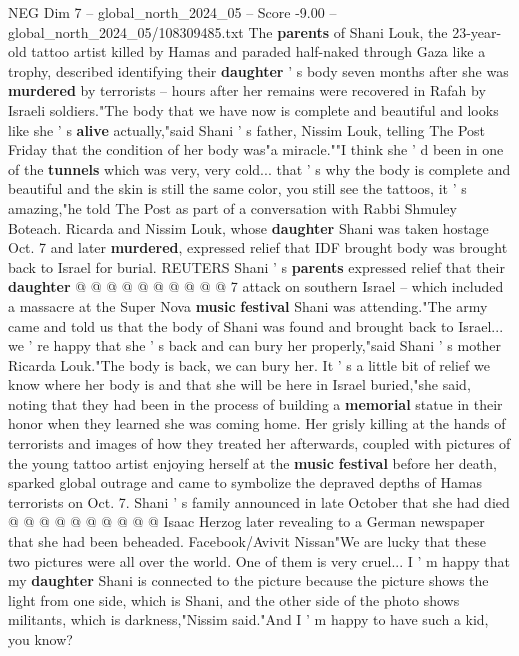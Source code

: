 \begin{textsample}{NEG Dim 7 – global\_north\_2024\_05 – Score -9.00 – global\_north\_2024\_05/108309485.txt}  \label{ex:f7_neg_181}
The \textbf{parents} of Shani Louk, the 23-year-old tattoo artist killed by Hamas and paraded half-naked through Gaza like a trophy, described identifying their \textbf{daughter} ' s body seven months after she was \textbf{murdered} by terrorists -- hours after her remains were recovered in Rafah by Israeli soldiers."The body that we have now is complete and beautiful and looks like she ' s \textbf{alive} actually,"said Shani ' s father, Nissim Louk, telling The Post Friday that the condition of her body was"a miracle.""I think she ' d been in one of the \textbf{tunnels} which was very, very cold... that ' s why the body is complete and beautiful and the skin is still the same color, you still see the tattoos, it ' s amazing,"he told The Post as part of a conversation with Rabbi Shmuley Boteach.
Ricarda and Nissim Louk, whose \textbf{daughter} Shani was taken hostage Oct. 7 and later \textbf{murdered}, expressed relief that IDF brought body was brought back to Israel for burial.
REUTERS Shani ' s \textbf{parents} expressed relief that their \textbf{daughter} @ @ @ @ @ @ @ @ @ @ 7 attack on southern Israel -- which included a massacre at the Super Nova \textbf{music} \textbf{festival} Shani was attending."The army came and told us that the body of Shani was found and brought back to Israel... we ' re happy that she ' s back and can bury her properly,"said Shani ' s mother Ricarda Louk."The body is back, we can bury her.
It ' s a little bit of relief we know where her body is and that she will be here in Israel buried,"she said, noting that they had been in the process of building a \textbf{memorial} statue in their honor when they learned she was coming home.
Her grisly killing at the hands of terrorists and images of how they treated her afterwards, coupled with pictures of the young tattoo artist enjoying herself at the \textbf{music} \textbf{festival} before her death, sparked global outrage and came to symbolize the depraved depths of Hamas terrorists on Oct. 7.
Shani ' s family announced in late October that she had died @ @ @ @ @ @ @ @ @ @ Isaac Herzog later revealing to a German newspaper that she had been beheaded.
Facebook/Avivit Nissan"We are lucky that these two pictures were all over the world.
One of them is very cruel...
I ' m happy that my \textbf{daughter} Shani is connected to the picture because the picture shows the light from one side, which is Shani, and the other side of the photo shows militants, which is darkness,"Nissim said."And I ' m happy to have such a kid, you know?

\end{textsample}
